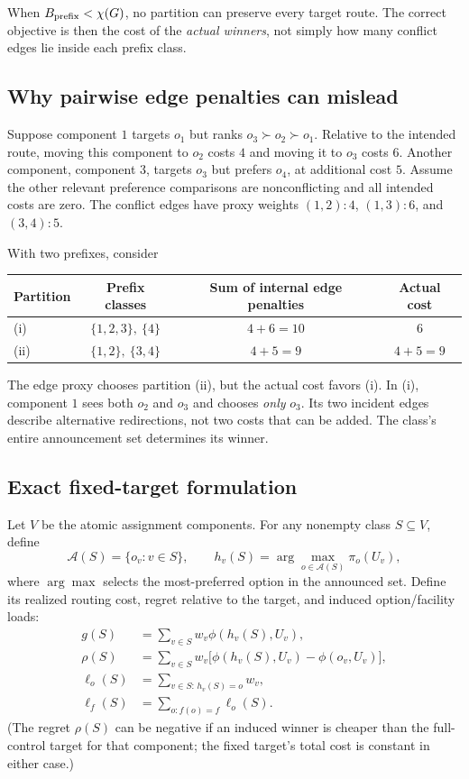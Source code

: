 \documentclass[10pt,a4paper]{article}
\begin{document}
When $B_{\rm prefix}<\chi(G)$, no partition can preserve every target route. The correct objective is then the cost of the \emph{actual winners}, not simply how many conflict edges lie inside each prefix class.

\subsection{Why pairwise edge penalties can mislead}

Suppose component $1$ targets $o_1$ but ranks $o_3\succ o_2\succ o_1$. Relative to the intended route, moving this component to $o_2$ costs $4$ and moving it to $o_3$ costs $6$. Another component, component $3$, targets $o_3$ but prefers $o_4$, at additional cost $5$. Assume the other relevant preference comparisons are nonconflicting and all intended costs are zero. The conflict edges have proxy weights $(1,2):4$, $(1,3):6$, and $(3,4):5$.

With two prefixes, consider
\begin{center}
\small
\begin{tabular}{@{}lccc@{}}
\toprule
Partition & Prefix classes & Sum of internal edge penalties & Actual cost\\
\midrule
(i) & $\{1,2,3\},\ \{4\}$ & $4+6=10$ & $6$\\
(ii) & $\{1,2\},\ \{3,4\}$ & $4+5=9$ & $4+5=9$\\
\bottomrule
\end{tabular}
\end{center}
The edge proxy chooses partition (ii), but the actual cost favors (i). In (i), component $1$ sees both $o_2$ and $o_3$ and chooses \emph{only} $o_3$. Its two incident edges describe alternative redirections, not two costs that can be added. The class's entire announcement set determines its winner.

\subsection{Exact fixed-target formulation}

Let $V$ be the atomic assignment components. For any nonempty class $S\subseteq V$, define
\[
\mathcal A(S)=\{o_v:v\in S\},\qquad
h_v(S)=\arg\max_{o\in\mathcal A(S)}\pi_o(U_v),
\]
where $\arg\max$ selects the most-preferred option in the announced set. Define its realized routing cost, regret relative to the target, and induced option/facility loads:
\begin{align}
g(S)&=\sum_{v\in S}w_v\phi(h_v(S),U_v),\label{eq:g}\\
\rho(S)&=\sum_{v\in S}w_v\bigl[\phi(h_v(S),U_v)-\phi(o_v,U_v)\bigr],\label{eq:rho}\\
\ell_o(S)&=\sum_{v\in S:\,h_v(S)=o}w_v,\label{eq:ell}\\
\ell_f(S)&=\sum_{o:f(o)=f}\ell_o(S).\label{eq:ellF}
\end{align}
(The regret $\rho(S)$ can be negative if an induced winner is cheaper than the full-control target for that component; the fixed target's total cost is constant in either case.)
\end{document}
